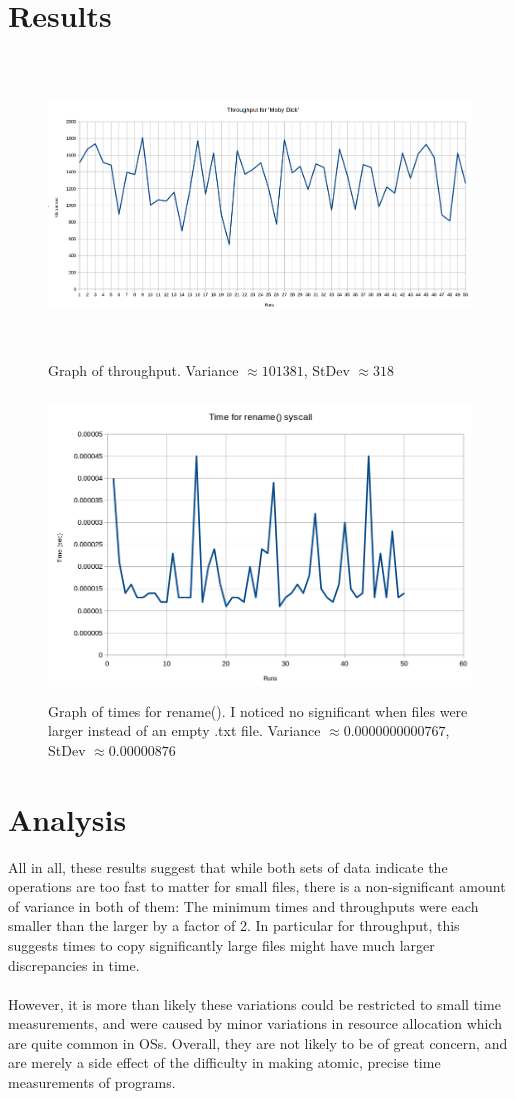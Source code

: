 \documentclass[10pt]{article}
\begin{document}
\section*{Results}
\begin{figure}[!h]
  \centering
  \includegraphics[height=8cm,keepaspectratio]{throughput.png}
  \caption{Graph of throughput. Variance $\approx 101381$, StDev $\approx 318$}
\end{figure}
\begin{figure}[!h]
  \centering
  \includegraphics[height=8cm,keepaspectratio]{rename_times.png}
  \caption{Graph of times for rename(). I noticed no significant when
    files were larger instead of an empty .txt file. Variance $\approx 0.0000000000767$, StDev $\approx 0.00000876$}
\end{figure}
\newpage
\section*{Analysis}
All in all, these results suggest that while both sets of data indicate the operations are too fast to matter for small files, there is a non-significant amount of variance in both of them: The minimum times and throughputs were each smaller than the larger by a factor of 2. In particular for throughput, this suggests times to copy significantly large files might have much larger discrepancies in time. \\ \\
However, it is more than likely these variations could be restricted to small time measurements, and were caused by minor variations in resource allocation which are quite common in OSs. Overall, they are not likely to be of great concern, and are merely a side effect of the difficulty in making atomic, precise time measurements of programs.
\end{document}

